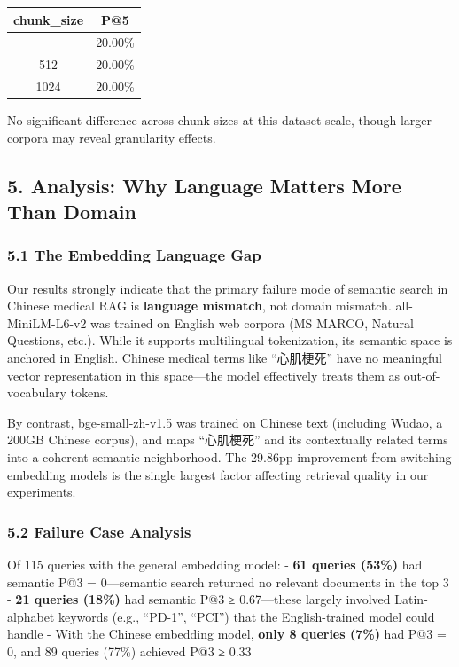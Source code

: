 \documentclass[
]{article}
\begin{document}
\begin{longtable}[]{@{}cc@{}}
\toprule\noalign{}
chunk\_size & P@5 \\
\midrule\noalign{}
\endhead
\bottomrule\noalign{}
\endlastfoot
256 & 20.00\% \\
512 & 20.00\% \\
1024 & 20.00\% \\
\end{longtable}

No significant difference across chunk sizes at this dataset scale,
though larger corpora may reveal granularity effects.

\subsection{5. Analysis: Why Language Matters More Than
Domain}\label{analysis-why-language-matters-more-than-domain}

\subsubsection{5.1 The Embedding Language
Gap}\label{the-embedding-language-gap}

Our results strongly indicate that the primary failure mode of semantic
search in Chinese medical RAG is \textbf{language mismatch}, not domain
mismatch. all-MiniLM-L6-v2 was trained on English web corpora (MS MARCO,
Natural Questions, etc.). While it supports multilingual tokenization,
its semantic space is anchored in English. Chinese medical terms like
``心肌梗死'' have no meaningful vector representation in this
space---the model effectively treats them as out-of-vocabulary tokens.

By contrast, bge-small-zh-v1.5 was trained on Chinese text (including
Wudao, a 200GB Chinese corpus), and maps ``心肌梗死'' and its
contextually related terms into a coherent semantic neighborhood. The
29.86pp improvement from switching embedding models is the single
largest factor affecting retrieval quality in our experiments.

\subsubsection{5.2 Failure Case Analysis}\label{failure-case-analysis}

Of 115 queries with the general embedding model: - \textbf{61 queries
(53\%)} had semantic P@3 = 0---semantic search returned no relevant
documents in the top 3 - \textbf{21 queries (18\%)} had semantic P@3 ≥
0.67---these largely involved Latin-alphabet keywords (e.g., ``PD-1'',
``PCI'') that the English-trained model could handle - With the Chinese
embedding model, \textbf{only 8 queries (7\%)} had P@3 = 0, and 89
queries (77\%) achieved P@3 ≥ 0.33
\end{document}
